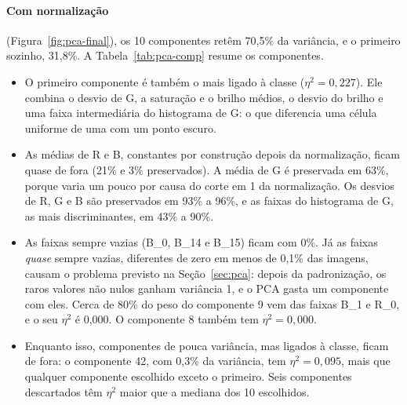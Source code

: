 \documentclass[11pt,a4paper]{article}
\begin{document}
\paragraph{Com normalização} (Figura~\ref{fig:pca-final}), os 10 componentes retêm 70,5\% da
variância, e o primeiro sozinho, 31,8\%. A Tabela~\ref{tab:pca-comp} resume os componentes.
\begin{itemize}
  \item O primeiro componente é também o mais ligado à classe ($\eta^2=0{,}227$). Ele combina o desvio
        de G, a saturação e o brilho médios, o desvio do brilho e uma faixa intermediária do
        histograma de G: o que diferencia uma célula uniforme de uma com um ponto escuro.
  \item As médias de R e B, constantes por construção depois da normalização, ficam quase de fora
        (21\% e 3\% preservados). A média de G é preservada em 63\%, porque varia um pouco por causa
        do corte em 1 da normalização. Os desvios de R, G e B são preservados em 93\% a 96\%, e as
        faixas do histograma de G, as mais discriminantes, em 43\% a 90\%.
  \item As faixas sempre vazias (B\_0, B\_14 e B\_15) ficam com 0\%. Já as faixas \emph{quase} sempre
        vazias, diferentes de zero em menos de 0,1\% das imagens, causam o problema previsto na
        Seção~\ref{sec:pca}: depois da padronização, os raros valores não nulos ganham variância 1,
        e o PCA gasta um componente com eles. Cerca de 80\% do peso do componente 9 vem das faixas
        B\_1 e R\_0, e o seu $\eta^2$ é 0,000. O componente 8 também tem $\eta^2=0{,}000$.
  \item Enquanto isso, componentes de pouca variância, mas ligados à classe, ficam de fora: o
        componente 42, com 0,3\% da variância, tem $\eta^2=0{,}095$, mais que qualquer componente
        escolhido exceto o primeiro. Seis componentes descartados têm $\eta^2$ maior que a mediana dos
        10 escolhidos.
\end{itemize}
\end{document}
